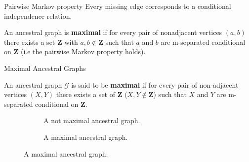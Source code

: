 \documentclass[english, compress, red]{beamer}
\begin{document}
\begin{frame}{Pairwise Markov property}
	Every missing edge corresponds to a conditional independence relation. 

	\begin{definition}
		An ancestral graph is \textbf{maximal} if for every pair of nonadjacent vertices $(a, b)$ there exists a set $\mathbf{Z}$ with $a, b \not \in \mathbf{Z}$ such that $a$ and $b$ are m-separated conditional on $\mathbf{Z}$ (i.e the pairwise Markov property holds).
	\end{definition}
	
\end{frame}

\begin{frame}{Maximal Ancestral Graphs}
	\begin{definition}
		An ancestral graph $\mathcal{G}$ is said to be \textbf{maximal} if for every pair of non-adjacent vertices $(X,Y)$ there exists a set of $\mathbf{Z}$ ($X,Y \not \in \mathbf{Z}$) such that $X$ and $Y$ are m-separated conditional on $\mathbf{Z}$.
	\end{definition}
    \begin{figure}
    	\begin{subfigure}{0.48\textwidth}
    		\centering
    		\caption{A not maximal ancestral graph.}
    	\end{subfigure}
    	\hfill
    	\begin{subfigure}{0.48\textwidth}
    		\centering
    		\caption{A maximal ancestral graph.}
    	\end{subfigure}
    \end{figure}
\end{frame}
\end{document}
